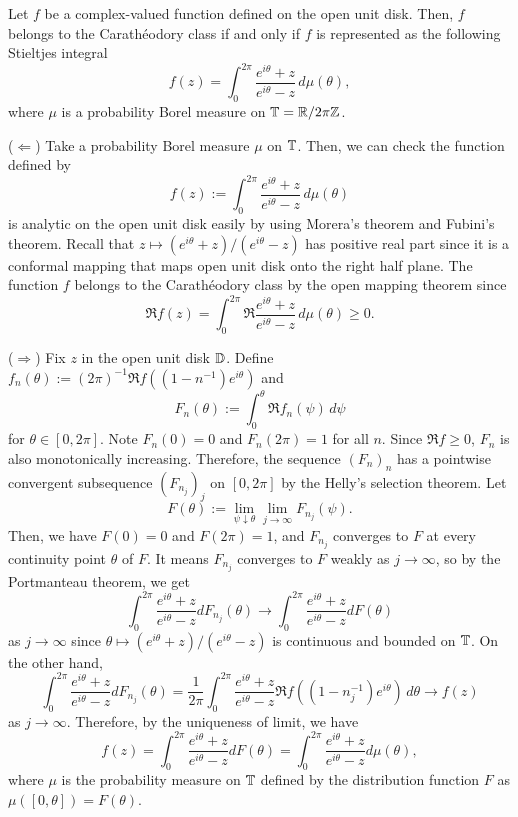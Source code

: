 \documentclass[a4paper]{article}
\begin{document}
\begin{thm}
Let $f$ be a complex-valued function defined on the open unit disk.
Then, $f$ belongs to the Carath\'eodory class if and only if $f$ is represented as the following Stieltjes integral
\[f(z)=\int_0^{2\pi}\frac{e^{i\theta}+z}{e^{i\theta}-z}\,d\mu(\theta),\]
where $\mu$ is a probability Borel measure on $\mathbb{T}=\mathbb{R}/2\pi\mathbb{Z}$.
\end{thm}
\begin{pf}
($\Leftarrow$)
Take a probability Borel measure $\mu$ on $\mathbb{T}$.
Then, we can check the function defined by
\[f(z):=\int_0^{2\pi}\frac{e^{i\theta}+z}{e^{i\theta}-z}\,d\mu(\theta)\]
is analytic on the open unit disk easily by using Morera's theorem and Fubini's theorem.
Recall that $z\mapsto(e^{i\theta}+z)/(e^{i\theta}-z)$ has positive real part since it is a conformal mapping that maps open unit disk onto the right half plane.
The function $f$ belongs to the Carath\'eodory class by the open mapping theorem since
\[\Re f(z)=\int_0^{2\pi}\Re\frac{e^{i\theta}+z}{e^{i\theta}-z}\,d\mu(\theta)\ge0.\]

($\Rightarrow$)
Fix $z$ in the open unit disk $\mathbb{D}$.
Define $f_n(\theta):=(2\pi)^{-1}\Re f((1-n^{-1})e^{i\theta})$ and
\[F_n(\theta):=\int_0^\theta\Re f_n(\psi)\,d\psi\]
for $\theta\in[0,2\pi]$.
Note $F_n(0)=0$ and $F_n(2\pi)=1$ for all $n$.
Since $\Re f\ge0$, $F_n$ is also monotonically increasing.
Therefore, the sequence $(F_n)_n$ has a pointwise convergent subsequence $(F_{n_j})_j$ on $[0,2\pi]$ by the Helly's selection theorem.
Let
\[F(\theta):=\lim_{\psi\downarrow\theta}\lim_{j\to\infty}F_{n_j}(\psi).\]
Then, we have $F(0)=0$ and $F(2\pi)=1$, and $F_{n_j}$ converges to $F$ at every continuity point $\theta$ of $F$.
It means $F_{n_j}$ converges to $F$ weakly as $j\to\infty$, so by the Portmanteau theorem, we get
\[\int_0^{2\pi}\frac{e^{i\theta}+z}{e^{i\theta}-z}dF_{n_j}(\theta)\to\int_0^{2\pi}\frac{e^{i\theta}+z}{e^{i\theta}-z}dF(\theta)\]
as $j\to\infty$ since $\theta\mapsto(e^{i\theta}+z)/(e^{i\theta}-z)$ is continuous and bounded on $\mathbb{T}$.
On the other hand,
\[\int_0^{2\pi}\frac{e^{i\theta}+z}{e^{i\theta}-z}dF_{n_j}(\theta)
=\frac1{2\pi}\int_0^{2\pi}\frac{e^{i\theta}+z}{e^{i\theta}-z}\Re f((1-n_j^{-1})e^{i\theta})\,d\theta\to f(z)\]
as $j\to\infty$.
Therefore, by the uniqueness of limit, we have
\[f(z)=\int_0^{2\pi}\frac{e^{i\theta}+z}{e^{i\theta}-z}dF(\theta)=\int_0^{2\pi}\frac{e^{i\theta}+z}{e^{i\theta}-z}d\mu(\theta),\]
where $\mu$ is the probability measure on $\mathbb{T}$ defined by the distribution function $F$ as $\mu([0,\theta])=F(\theta)$.
\end{pf}
\end{document}
